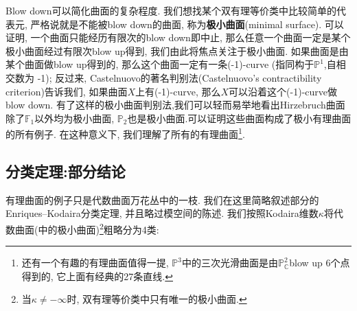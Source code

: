 \documentclass[UTF8,12pt,twoside]{article}
\theoremstyle{definition}
\newcommand{\CC}{\mathbb{C}}  %
\newcommand{\PCC}{\mathbb{P}_{\CC}^2} %
\numberwithin{equation}{section}
\begin{document}
Blow down可以简化曲面的复杂程度. 我们想找某个双有理等价类中比较简单的代表元, 严格说就是不能被blow down的曲面, 称为\textbf{极小曲面}(minimal surface). 可以证明, 一个曲面只能经历有限次的blow down即中止, 那么任意一个曲面一定是某个极小曲面经过有限次blow up得到, 我们由此将焦点关注于极小曲面. 如果曲面是由某个曲面做blow up得到的, 那么这个曲面一定有一条(-1)-curve (指同构于$\mathbb{P}^1$,自相交数为 -1);      反过来, Castelnuovo的著名判别法(Castelnuovo's contractibility criterion)告诉我们, 如果曲面$X$上有(-1)-curve, 那么$X$可以沿着这个(-1)-curve做blow down. 有了这样的极小曲面判别法,我们可以轻而易举地看出Hirzebruch曲面除了$\mathbb{F}_1$以外均为极小曲面, $\mathbb{P}_2$也是极小曲面.可以证明这些曲面构成了极小有理曲面的所有例子. 在这种意义下, 我们理解了所有的有理曲面\footnote{还有一个有趣的有理曲面值得一提, $\mathbb{P}^3$中的三次光滑曲面是由$\PCC$blow up 6个点得到的, 它上面有经典的27条直线.}.

\subsection{分类定理:部分结论}
有理曲面的例子只是代数曲面万花丛中的一枝. 我们在这里简略叙述部分的Enriques–Kodaira分类定理, 并且略过模空间的陈述. 我们按照Kodaira维数$\kappa$将代数曲面(中的极小曲面)\footnote{当$\kappa\neq-\infty$时, 双有理等价类中只有唯一的极小曲面.}粗略分为4类: 
\end{document}
